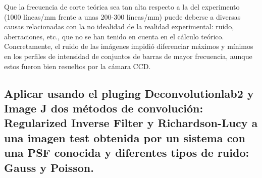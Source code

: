 \documentclass{./packages/optica-article}
\begin{document}
\begin{enumerate}
\begin{enumerate}
		            Que la frecuencia de corte teórica sea tan alta respecto a la del experimento (1000 líneas/mm frente a unas 200-300 líneas/mm) puede deberse a diversas causas relacionadas con la no idealidad de la realidad experimental: ruido, aberraciones, etc., que no se han tenido en cuenta en el cálculo teórico. Concretamente, el ruido de las imágenes impidió diferenciar máximos y mínimos en los perfiles de intensidad de conjuntos de barras de mayor frecuencia, aunque estos fueron bien resueltos por la cámara CCD.

	      \end{enumerate}

\end{enumerate}


\subsection{Aplicar usando el pluging Deconvolutionlab2 y Image J dos métodos de convolución: Regularized Inverse Filter y Richardson-Lucy a una imagen test obtenida por un sistema con una PSF conocida y diferentes tipos de ruido: Gauss y Poisson.}
\end{document}
